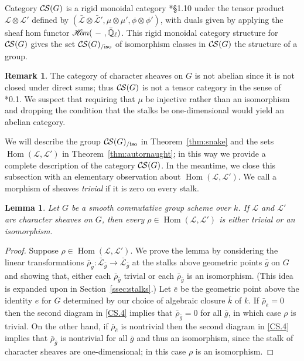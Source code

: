 \documentclass[10pt]{amsart}
\theoremstyle{plain}
\newtheorem{lemma}[theorem]{Lemma}
\theoremstyle{definition}
\newtheorem{remark}[theorem]{Remark}
\newcommand{\EE}{\mathbb{\bar Q}_\ell}
\newcommand{\bFq}{\bar{k}}
\newcommand{\Fq}{k}
\DeclareMathOperator{\Hom}{Hom}
\newcommand{\sheafHom}{{\mathscr{H}\hskip-4pt{\it o}\hskip-2pt{\it m}}}
\newcommand{\cs}[1]{{\mathcal{#1}}}
\newcommand{\gcs}[1]{{\mathcal{\bar #1}}}
\newcommand{\CS}{{\mathcal{C\hskip-0.8pt S}}}
\newcommand{\CSiso}[1]{\CS(#1)_{/\text{iso}}}
\newcommand{\bg}{{\bar{g}}}
\newcommand{\brho}{{\bar\rho}}
\begin{document}
Category $\CS(G)$ is a rigid monoidal category
\cite{etingof:09a}*{\S1.10} under the tensor product
$\cs{L} \otimes \cs{L'}$ defined by $(\gcs{L}\otimes\gcs{L'}, \mu\otimes\mu', \phi\otimes \phi')$,
with duals given by applying the sheaf hom functor
$\sheafHom(\ - \ ,\EE)$.
This rigid monoidal category structure for $\CS(G)$ gives the set $\CSiso{G}$
of isomorphism classes in $\CS(G)$ the structure of a group.

\begin{remark}
The category of character sheaves on $G$ is not abelian since it is not closed under direct sums; 
thus $\CS(G)$ is not a tensor category in the sense of \cite{deligne:02a}*{0.1}.  
We suspect that requiring that $\mu$ be injective rather than
an isomorphism and dropping the condition that the stalks be one-dimensional would yield an abelian category.
\end{remark}

We will describe the group $\CSiso{G}$ in Theorem~\ref{thm:snake}
and the sets $\Hom(\cs{L},\cs{L}')$ in Theorem~\ref{thm:autornaught}; in this way we provide a complete description of the category $\CS(G)$.
%
In the meantime, we close this subsection with an elementary observation about $\Hom(\cs{L},\cs{L}')$.
We call a morphism of sheaves \emph{trivial} if it is zero on every stalk.

\begin{lemma}\label{lem:autornaught}
Let $G$ be a smooth commutative group scheme over $\Fq$.
If $\cs{L}$ and $\cs{L}'$ are character sheaves on $G$, then
every $\rho\in \Hom(\cs{L},\cs{L}')$ is either trivial or an isomorphism. 
\end{lemma}

\begin{proof}
Suppose $\rho \in \Hom(\cs{L},\cs{L}')$.
We prove the lemma by considering the linear transformations $\brho_{\bg} : \gcs{L}_{\bg} \to \gcs{L}_{\bg}$ at the stalks above geometric points $\bg$ on $G$ and showing that, either each $\brho_{\bg}$ trivial or each $\brho_{\bg}$ is an isomorphism.
(This idea is expanded upon in Section~\ref{ssec:stalks}.)
Let ${\bar e}$ be the geometric point above the identity $e$ for $G$ determined by our choice of algebraic closure $\bFq$ of $\Fq$.
If $\brho_{\bar e} = 0$ then the second diagram in \ref{CS.4} implies that $\brho_{\bg} = 0$ for all $\bg$, in which case $\rho$ is trivial.
On the other hand, if $\brho_{\bar e}$ is nontrivial then the second diagram in \ref{CS.4}  implies that $\brho_{\bg}$ is nontrivial for all $\bg$ and thus an isomorphism, since the stalk of character sheaves are one-dimensional; in this case $\rho$ is an isomorphism.
\end{proof}
\end{document}
